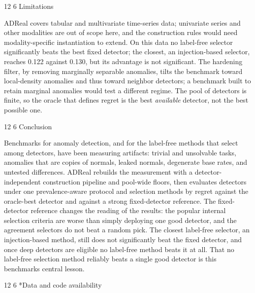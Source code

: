 \documentclass[3p,twocolumn]{elsarticle}
\makeatletter
\renewcommand\section{\@startsection{section}{1}{\z@}%
           {12\p@ \@plus 4\p@ \@minus 4\p@}%
           {6\p@ \@plus 4\p@ \@minus 3\p@}%
           {\normalsize\bfseries\boldmath}}
\makeatother
\begin{document}
\section{Limitations}\label{7-limitations}

ADReal covers tabular and multivariate time-series data; univariate series and other modalities are out of scope here, and the construction rules would need modality-specific instantiation to extend. On this data no label-free selector significantly beats the best fixed detector; the closest, an injection-based selector, reaches 0.122 against 0.130, but its advantage is not significant. The hardening filter, by removing marginally separable anomalies, tilts the benchmark toward local-density anomalies and thus toward neighbor detectors; a benchmark built to retain marginal anomalies would test a different regime. The pool of detectors is finite, so the oracle that defines regret is the best \emph{available} detector, not the best possible one.

\section{Conclusion}\label{8-conclusion}

Benchmarks for anomaly detection, and for the label-free methods that select among detectors, have been measuring artifacts: trivial and unsolvable tasks, anomalies that are copies of normals, leaked normals, degenerate base rates, and untested differences. ADReal rebuilds the measurement with a detector-independent construction pipeline and pool-wide floors, then evaluates detectors under one prevalence-aware protocol and selection methods by regret against the oracle-best detector and against a strong fixed-detector reference. The fixed-detector reference changes the reading of the results: the popular internal selection criteria are worse than simply deploying one good detector, and the agreement selectors do not beat a random pick. The closest label-free selector, an injection-based method, still does not significantly beat the fixed detector, and once deep detectors are eligible no label-free method beats it at all. That no label-free selection method reliably beats a single good detector is this benchmark\textquotesingle s central lesson.

\section*{Data and code availability}\label{data-and-code-availability}
\end{document}
